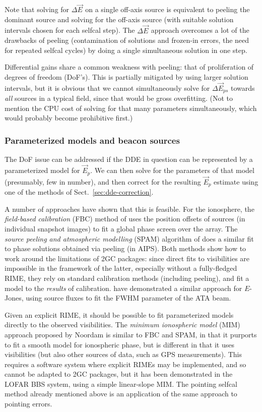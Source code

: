 \documentclass{aa}
\newcommand{\jones}[2]{\vec {#1}_{#2}}
\begin{document}
Note that solving for $\Delta\jones{E}{}$ on a single off-axis source is equivalent to peeling the dominant source and solving for the off-axis source (with suitable solution intervals chosen for each selfcal step). The $\Delta\jones{E}{}$ approach overcomes a lot of the drawbacks of peeling (contamination of solutions and frozen-in errors, the need for repeated selfcal cycles) by doing a single simultaneous solution in one step.

Differential gains share a common weakness with peeling: that of proliferation of degrees of freedom (DoF's). This is partially mitigated by using larger solution intervals, but it is obvious that we cannot simultaneously solve for $\Delta\jones{E}{ps}$ towards \emph{all} sources in a typical field, since that would be gross overfitting. (Not to mention the CPU cost of solving for that many parameters simultaneously, which would probably become prohibitive first.) 

\subsubsection{Parameterized models and beacon sources}

The DoF issue can be addressed if the DDE in question can be represented by a parameterized model for $\jones{E}{p}$. We can then solve for the parameters of that model (presumably, few in number), and then correct for the resulting $\jones{E}{p}$ estimate using one of the methods of Sect.~\ref{sec:dde-correction}. 

A number of approaches have shown that this is feasible. For the ionosphere, the \emph{field-based calibration} (FBC) method of \citet{Cotton:FBC} uses the position offsets of sources (in individual snapshot images) to fit a global phase screen over the array. The \emph{source peeling and atmospheric modelling} (SPAM) algorithm of \citet{Intema:SPAM} does a similar fit to phase solutions obtained via peeling (in AIPS). Both methods show how to work around the limitations of 2GC packages: since direct fits to visibilities are impossible in the framework of the latter, especially without a fully-fledged RIME, they rely on standard calibration methods (including peeling), and fit a model to the \emph{results} of calibration. \citet{Hull:ata-beam-fitting} have demonstrated a similar approach for $E$-Jones, using source fluxes to fit the FWHM parameter of the ATA beam. 

Given an explicit RIME, it should be possible to fit parameterized models directly to the observed visibilities. The \emph{minimum ionospheric model} (MIM) approach proposed by Noordam is similar to FBC and SPAM, in that it purports to fit a smooth model for ionospheric phase, but is different in that it uses visibilities (but also other sources of data, such as GPS measurements). This requires a software system where explicit RIMEs may be implemented, and so cannot be adapted to 2GC packages, but it has been demonstrated in the LOFAR BBS system, using a simple linear-slope MIM. The pointing selfcal method \citep{SB:pointing} already mentioned above is an application of the same approach to pointing errors.
\end{document}
